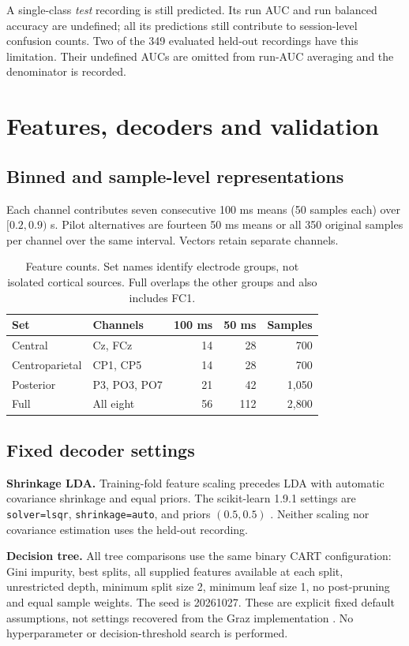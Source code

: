 \documentclass[11pt,a4paper]{article}
\begin{document}
A single-class \emph{test} recording is still predicted. Its run AUC and run balanced accuracy are undefined; all its predictions still contribute to session-level confusion counts. Two of the 349 evaluated held-out recordings have this limitation. Their undefined AUCs are omitted from run-AUC averaging and the denominator is recorded.

\clearpage
\section{Features, decoders and validation}
\subsection{Binned and sample-level representations}
Each channel contributes seven consecutive 100 ms means (50 samples each) over $[0.2,0.9)$ s. Pilot alternatives are fourteen 50 ms means or all 350 original samples per channel over the same interval. Vectors retain separate channels.
\begin{table}[H]\centering\small
\begin{tabular}{@{}llrrr@{}}\toprule
Set & Channels & 100 ms & 50 ms & Samples\\\midrule
Central & Cz, FCz & 14 & 28 & 700\\
Centroparietal & CP1, CP5 & 14 & 28 & 700\\
Posterior & P3, PO3, PO7 & 21 & 42 & 1,050\\
Full & All eight & 56 & 112 & 2,800\\\bottomrule
\end{tabular}
\caption{Feature counts. Set names identify electrode groups, not isolated cortical sources. Full overlaps the other groups and also includes FC1.}\label{tab:features}
\end{table}

\subsection{Fixed decoder settings}
\textbf{Shrinkage LDA.} Training-fold feature scaling precedes LDA with automatic covariance shrinkage and equal priors. The scikit-learn 1.9.1 settings are \texttt{solver=lsqr}, \texttt{shrinkage=auto}, and priors $(0.5,0.5)$ \cite{sklda}. Neither scaling nor covariance estimation uses the held-out recording.

\textbf{Decision tree.} All tree comparisons use the same binary CART configuration: Gini impurity, best splits, all supplied features available at each split, unrestricted depth, minimum split size 2, minimum leaf size 1, no post-pruning and equal sample weights. The seed is 20261027. These are explicit fixed default assumptions, not settings recovered from the Graz implementation \cite{sktree}. No hyperparameter or decision-threshold search is performed.
\end{document}
